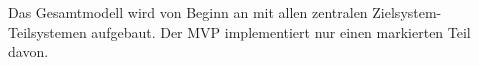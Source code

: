 Das Gesamtmodell wird von Beginn an mit allen zentralen Zielsystem-Teilsystemen aufgebaut. Der MVP implementiert nur einen markierten Teil davon.
